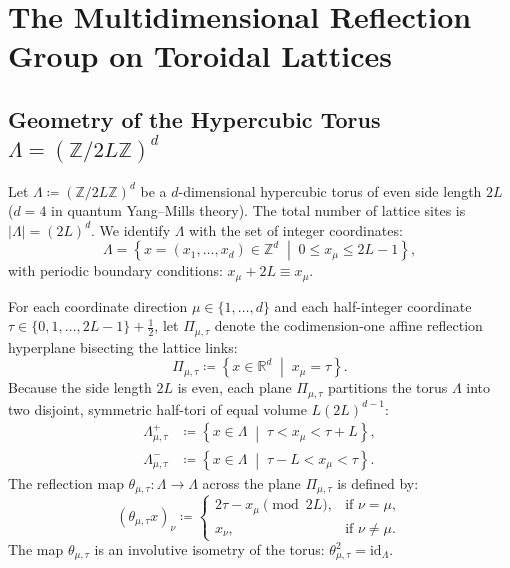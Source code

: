 \section{The Multidimensional Reflection Group on Toroidal Lattices}
\label{sec:reflection_group_torus}

\subsection{Geometry of the Hypercubic Torus \texorpdfstring{$\Lambda = (\mathbb{Z}/2L\mathbb{Z})^d$}{Lambda = (Z/2LZ)d}}
\label{subsec:hypercubic_torus_geom}

Let $\Lambda \coloneqq (\mathbb{Z} / 2L\mathbb{Z})^d$ be a $d$-dimensional hypercubic torus of even side length $2L$ ($d = 4$ in quantum Yang--Mills theory). The total number of lattice sites is $|\Lambda| = (2L)^d$. We identify $\Lambda$ with the set of integer coordinates:
\begin{equation}
\Lambda = \left\{ x = (x_1, \dots, x_d) \in \mathbb{Z}^d \;\middle|\; 0 \le x_\mu \le 2L - 1 \right\},
\end{equation}
with periodic boundary conditions: $x_\mu + 2L \equiv x_\mu$.

For each coordinate direction $\mu \in \{1, \dots, d\}$ and each half-integer coordinate $\tau \in \{0, 1, \dots, 2L-1\} + \frac{1}{2}$, let $\Pi_{\mu, \tau}$ denote the codimension-one affine reflection hyperplane bisecting the lattice links:
\begin{equation}
\label{eq:reflection_plane_def}
\Pi_{\mu, \tau} \coloneqq \left\{ x \in \mathbb{R}^d \;\middle|\; x_\mu = \tau \right\}.
\end{equation}
Because the side length $2L$ is even, each plane $\Pi_{\mu, \tau}$ partitions the torus $\Lambda$ into two disjoint, symmetric half-tori of equal volume $L (2L)^{d-1}$:
\begin{align}
\Lambda_{\mu, \tau}^+ &\coloneqq \left\{ x \in \Lambda \;\middle|\; \tau < x_\mu < \tau + L \right\}, \\
\Lambda_{\mu, \tau}^- &\coloneqq \left\{ x \in \Lambda \;\middle|\; \tau - L < x_\mu < \tau \right\}.
\end{align}
The reflection map $\theta_{\mu, \tau} : \Lambda \to \Lambda$ across the plane $\Pi_{\mu, \tau}$ is defined by:
\begin{equation}
\label{eq:reflection_map_coords}
(\theta_{\mu, \tau} x)_\nu \coloneqq \begin{cases} 
2\tau - x_\mu \pmod{2L}, & \text{if } \nu = \mu, \\
x_\nu, & \text{if } \nu \neq \mu.
\end{cases}
\end{equation}
The map $\theta_{\mu, \tau}$ is an involutive isometry of the torus: $\theta_{\mu, \tau}^2 = \mathrm{id}_\Lambda$.

